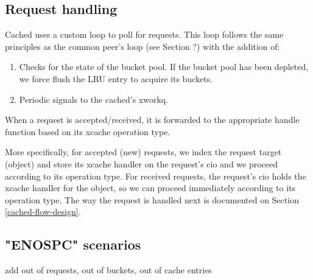 \subsection{Request handling}

Cached uses a custom loop to poll for requests. This loop follows the same 
principles as the common peer's loop (see Section ?) with the addition of:

\begin{enumerate}
	\item Checks for the state of the bucket pool. If the bucket pool has 
		been depleted, we force flush the LRU entry to acquire its 
		buckets.
	\item Periodic signals to the cached's xworkq.
\end{enumerate}

When a request is accepted/received, it is forwarded to the appropriate handle 
function based on its xcache operation type.

More specifically, for accepted (new) requests, we index the request target 
(object) and store its xcache handler on the request's cio and we proceed 
according to its operation type. For received requests, the request's cio holds 
the xcache handler for the object, so we can proceed immediately according to 
its operation type. The way the request is handled next is documented on 
Section \ref{cached-flow-design}.

\subsection{"ENOSPC" scenarios}

\fixme add out of requests, out of buckets, out of cache entries
